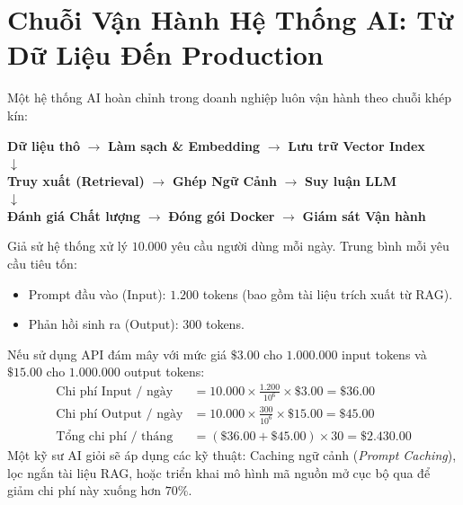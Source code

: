\section{Chuỗi Vận Hành Hệ Thống AI: Từ Dữ Liệu Đến Production}
\label{sec:ai-lifecycle}

Một hệ thống AI hoàn chỉnh trong doanh nghiệp luôn vận hành theo chuỗi khép kín:
\begin{center}
\textbf{Dữ liệu thô} $\longrightarrow$ \textbf{Làm sạch \& Embedding} $\longrightarrow$ \textbf{Lưu trữ Vector Index}\\
$\downarrow$\\
\textbf{Truy xuất (Retrieval)} $\longrightarrow$ \textbf{Ghép Ngữ Cảnh} $\longrightarrow$ \textbf{Suy luận LLM}\\
$\downarrow$\\
\textbf{Đánh giá Chất lượng} $\longrightarrow$ \textbf{Đóng gói Docker} $\longrightarrow$ \textbf{Giám sát Vận hành}
\end{center}

\begin{workedexamplebox}
Giả sử hệ thống xử lý $10.000$ yêu cầu người dùng mỗi ngày. Trung bình mỗi yêu cầu tiêu tốn:
\begin{itemize}
  \item Prompt đầu vào (Input): $1.200$ tokens (bao gồm tài liệu trích xuất từ RAG).
  \item Phản hồi sinh ra (Output): $300$ tokens.
\end{itemize}
Nếu sử dụng API đám mây với mức giá $\$3.00$ cho $1.000.000$ input tokens và $\$15.00$ cho $1.000.000$ output tokens:
\begin{align*}
\text{Chi phí Input / ngày} &= 10.000 \times \frac{1.200}{10^6} \times \$3.00 = \$36.00 \\
\text{Chi phí Output / ngày} &= 10.000 \times \frac{300}{10^6} \times \$15.00 = \$45.00 \\
\text{Tổng chi phí / tháng} &= (\$36.00 + \$45.00) \times 30 = \$2.430.00
\end{align*}
Một kỹ sư AI giỏi sẽ áp dụng các kỹ thuật: Caching ngữ cảnh (\textit{Prompt Caching}), lọc ngắn tài liệu RAG, hoặc triển khai mô hình mã nguồn mở cục bộ qua  để giảm chi phí này xuống hơn $70\%$.
\end{workedexamplebox}

